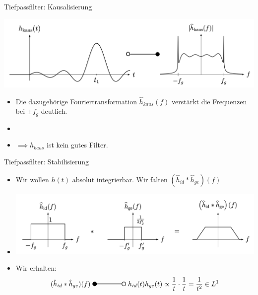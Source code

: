 \documentclass[14pt, aspectratio=169, handout]{beamer}
\newcommand{\invtransform}[2]{%
    \begin{tikzpicture}
        \filldraw[thick] (0,0) circle (0.1);
        \draw[thick] (0.1,0) -- (#2 -0.1,0) node[midway, above] {#1};
        \draw[thick] (#2,0) circle (0.1);
    \end{tikzpicture}%
}
\begin{document}
\begin{frame}{Tiefpassfilter: Kausalisierung}
    \begin{center}
        \includegraphics[width=0.8\linewidth]{figures/h_kausal.jpg}
    \end{center}
    \begin{itemize}
    \item Die dazugehörige Fouriertransformation $\hat{h}_{kaus}(f)$ verstärkt die Frequenzen bei $\pm f_g$ deutlich. 
    \item[] 
    \item $\implies h_{kaus}$ ist kein gutes Filter.
    \end{itemize}
\end{frame}

\begin{frame}{Tiefpassfilter: Stabilisierung}
    \begin{itemize}
    \item Wir wollen $h(t)$ absolut integrierbar. Wir falten $(\hat{h}_{id}\ast \hat{h}_{ge}) (f)$
    \item[] \begin{center}
        \includegraphics[width=0.9\linewidth]{figures/h_stabil_freq.png}
    \end{center}
    \item Wir erhalten: $$(\hat{h}_{id} \ast \hat{h}_{ge})(f) \; \invtransform{}{1.5} \; h_{id}(t) h_{ge}(t) \propto \displaystyle\frac{1}{t} \cdot \displaystyle\frac{1}{t} = \displaystyle\frac{1}{t^2} \in L^1$$
    \end{itemize}
\end{frame}
\end{document}
